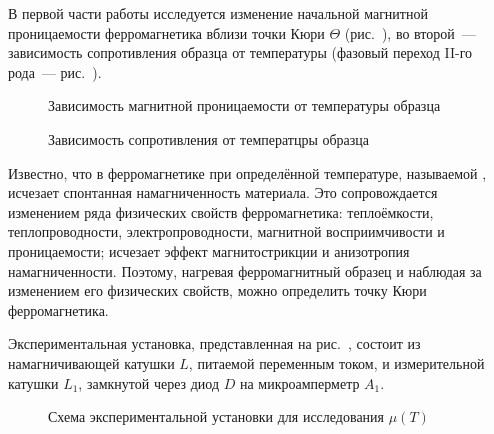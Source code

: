 






В первой части работы исследуется изменение начальной магнитной проницаемости ферромагнетика вблизи точки Кюри $\Theta$ (рис.~), во второй~--- зависимость сопротивления образца от температуры (фазовый переход II-го рода~--- рис.~).

\begin{figure}[h!]
	\begin{minipage}[b]{0.49\textwidth}
		\caption{Зависимость магнитной проницаемости от температуры образца}
	\end{minipage}
	\hfill
	\begin{minipage}[b]{0.49\textwidth}
		\caption{Зависимость сопротивления от температцры образца}
	\end{minipage}
\end{figure}


Известно, что в ферромагнетике при определённой температуре, называемой , исчезает спонтанная намагниченность материала. Это сопровождается изменением ряда физических свойств ферромагнетика: теплоёмкости, теплопроводности, электропроводности, магнитной восприимчивости и проницаемости; исчезает эффект магнитострикции и анизотропия намагниченности. Поэтому, нагревая ферромагнитный образец и наблюдая за изменением его физических свойств, можно определить точку Кюри ферромагнетика.


\experiment
Экспериментальная установка, представленная на рис.~, состоит из намагничивающей катушки $L$, питаемой переменным током, и измерительной катушки $L_1$, замкнутой через диод $D$ на микроамперметр $A_1$.

\begin{figure}[h!]
	\caption{Схема экспериментальной установки для исследования $\mu(T)$}
\end{figure}



